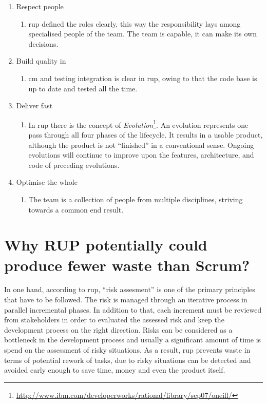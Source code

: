 \begin{enumerate}
    \item Respect people
    \begin{enumerate}
        \item \ac{rup} defined the roles clearly, this way the responsibility lays among specialised people of the team. The team is capable, it can make its own decisions.
    \end{enumerate}
    
    \item Build quality in
    \begin{enumerate}
        \item \ac{cm} and testing integration is clear in \ac{rup}, owing to that the code base is up to date and tested all the time.
    \end{enumerate}
    
    \item Deliver fast
    \begin{enumerate}
        \item In \ac{rup} there is the concept of \textit{Evolution}\footnote{\url{http://www.ibm.com/developerworks/rational/library/sep07/oneill/}}. An evolution represents one pass through all four phases of the lifecycle. It results in a usable product, although the product is not ``finished'' in a conventional sense. Ongoing evolutions will continue to improve upon the features, architecture, and code of preceding evolutions.
    \end{enumerate}
    
    \item Optimise the whole
    \begin{enumerate}
        \item The team is a collection of people from multiple disciplines, striving towards a common end result.
    \end{enumerate}
\end{enumerate}

\section{Why RUP potentially could produce fewer waste than Scrum?}

In one hand, according to \ac{rup}, ``risk assesment'' is one of the primary principles that have to be followed. The risk is managed through an iterative process in parallel incremental phases. In addition to that, each increment must be reviewed from stakeholders in order to evaluated the assessed risk and keep the development process on the right direction. Risks can be considered as a bottleneck in the development process and usually a significant amount of time is spend on the assessment of risky situations. As a result, \ac{rup} prevents waste in terms of potential rework of tasks, due to risky situations can be detected and avoided early enough to save time, money and even the product itself.

